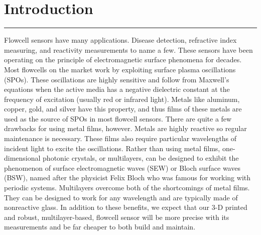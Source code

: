 \documentclass{report}
\begin{document}
	\section*{Introduction}
	\vspace{-0.1cm}\hrule\vspace{0.2cm}
	\par{Flowcell sensors have many applications. Disease detection, refractive index measuring, and reactivity measurements to name a few. These sensors have been operating on the principle of electromagnetic surface phenomena for decades. Most flowcells on the market work by exploiting surface plasma oscillations (SPOs). These oscillations are highly sensitive and follow from Maxwell's equations when the active media has a negative dielectric constant at the frequency of excitation (usually red or infrared light). Metals like aluminum, copper, gold, and silver have this property, and thus films of these metals are used as the source of SPOs in most flowcell sensors. There are quite a few drawbacks for using metal films, however. Metals are highly reactive so regular maintenance is necessary. These films also require particular wavelengths of incident light to excite the oscillations. Rather than using metal films, one-dimensional photonic crystals, or multilayers, can be designed to exhibit the phenomenon of surface electromagnetic waves (SEW) or Bloch surface waves (BSW), named after the physicist Felix Bloch who was famous for working with periodic systems. Multilayers overcome both of the shortcomings of metal films. They can be designed to work for any wavelength and are typically made of nonreactive glass. In addition to these benefits, we expect that our 3-D printed and robust, multilayer-based, flowcell sensor will be more precise with its measurements and be far cheaper to both build and maintain.}
\end{document}
